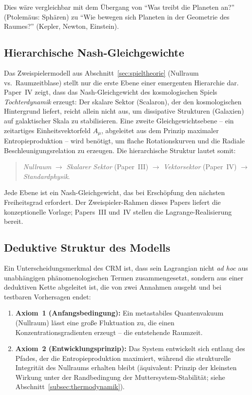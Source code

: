 \documentclass[aps,prd,twocolumn,superscriptaddress,nofootinbib]{revtex4-2}
\begin{document}
Dies w\"are vergleichbar mit dem \"Ubergang von ``Was treibt die Planeten an?'' (Ptolem\"aus: Sph\"aren) zu ``Wie bewegen sich Planeten in der Geometrie des Raumes?'' (Kepler, Newton, Einstein).

\subsection{Hierarchische Nash-Gleichgewichte}
\label{subsec:hierarchische_nash}

Das Zweispielermodell aus Abschnitt~\ref{sec:spieltheorie} (Nullraum vs.\ Raumzeitblase) stellt nur die erste Ebene einer emergenten Hierarchie dar. Paper~IV \cite{Geiger2026d} zeigt, dass das Nash-Gleichgewicht des kosmologischen Spiels \emph{Tochterdynamik} erzeugt: Der skalare Sektor (Scalaron), der den kosmologischen Hintergrund liefert, reicht allein nicht aus, um dissipative Strukturen (Galaxien) auf galaktischer Skala zu stabilisieren. Eine zweite Gleichgewichtsebene -- ein zeitartiges Einheitsvektorfeld $A_\mu$, abgeleitet aus dem Prinzip maximaler Entropieproduktion -- wird ben\"otigt, um flache Rotationskurven und die Radiale Beschleunigungsrelation zu erzeugen. Die hierarchische Struktur lautet somit:
\begin{quote}
\textit{Nullraum} $\to$ \textit{Skalarer Sektor} (Paper~III) $\to$ \textit{Vektorsektor} (Paper~IV) $\to$ \textit{Standardphysik}.
\end{quote}
Jede Ebene ist ein Nash-Gleichgewicht, das bei Ersch\"opfung den n\"achsten Freiheitsgrad erfordert. Der Zweispieler-Rahmen dieses Papers liefert die konzeptionelle Vorlage; Papers~III und~IV stellen die Lagrange-Realisierung bereit.

\subsection{Deduktive Struktur des Modells}
\label{subsec:deduktiv}

Ein Unterscheidungsmerkmal des CRM ist, dass sein Lagrangian nicht \textit{ad hoc} aus unabh\"angigen ph\"anomenologischen Termen zusammengesetzt, sondern aus einer deduktiven Kette abgeleitet ist, die von zwei Annahmen ausgeht und bei testbaren Vorhersagen endet:

\begin{enumerate}
\item \textbf{Axiom~1 (Anfangsbedingung):} Ein metastabiles Quantenvakuum (Nullraum) l\"asst eine gro\ss{}e Fluktuation zu, die einen Konzentrationsgradienten erzeugt -- die entstehende Raumzeit.
\item \textbf{Axiom~2 (Entwicklungsprinzip):} Das System entwickelt sich entlang des Pfades, der die Entropieproduktion maximiert, w\"ahrend die strukturelle Integrit\"at des Nullraums erhalten bleibt (\"aquivalent: Prinzip der kleinsten Wirkung unter der Randbedingung der Muttersystem-Stabilit\"at; siehe Abschnitt~\ref{subsec:thermodynamik}).
\end{enumerate}
\end{document}
